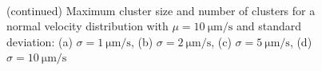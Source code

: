 \documentclass[../../master_thesis_np.tex]{subfiles}
\begin{document}
		\begin{figure}[t]
			\centering
			\ContinuedFloat
			\\
			
			\caption{(continued) Maximum cluster size and number of clusters for a normal velocity distribution with $\mu = \SI{10}{\um\per\second}$ and standard deviation: (a) $\sigma = \SI{1}{\um\per\second}$, (b) $\sigma = \SI{2}{\um\per\second}$, (c) $\sigma = \SI{5}{\um\per\second}$, (d) $\sigma = \SI{10}{\um\per\second}$}
			\label{fig:lj_vdist_clust}
		\end{figure}
		
\end{document}

